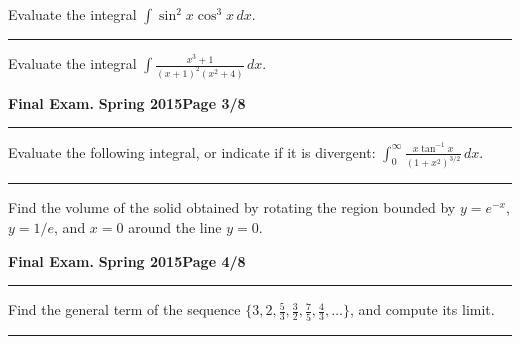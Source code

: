 \documentclass[12pt]{article}
\theoremstyle{definition}
\begin{document}
{\problem[5 pts] Evaluate the integral $\displaystyle{\int
    \sin^2 x \cos^3 x\, dx}$.
\vspace{3.5cm}
\begin{flushright}
\end{flushright}
\hrule

{\problem[5 pts] Evaluate the integral $\displaystyle{\int \frac{x^3+1}{(x+1)^2(x^2+4)}\, dx}$.}
\vspace{4.4cm}
\begin{flushright}
\end{flushright}
\newpage


\hfill{\large\bf Final Exam.}\hfill{\large\bf
  Spring 2015}\hfill{\large\bf Page 3/8}\hrule

\bigskip
{\problem[10 pts] Evaluate the following integral, or indicate if it is
divergent: $\displaystyle{\int_0^\infty \frac{x \tan^{-1}x}{(1+x^2)^{3/2}}\,
dx}$.}
\vspace{8cm}
\begin{flushright}
\end{flushright}
\hrule

{\problem [10 pts] Find the volume of the solid obtained by rotating the region bounded by $y=e^{-x}$, $y=1/e$, and $x=0$ around the line $y=0$.}
\vspace{8cm}
\begin{flushright}
\end{flushright}

\newpage

\hfill{\large\bf Final Exam.}\hfill{\large\bf
  Spring 2015}\hfill{\large\bf Page 4/8}\hrule

\bigskip
{\problem[10 pts] Find the general term of the sequence $\big\{
  3,2,\frac{5}{3}, \frac{3}{2}, \frac{7}{5}, \frac{4}{3}, \dotsc
  \big\}$, and compute its limit.}
\vspace{3cm}
\begin{flushright}
\end{flushright}
\hrule

}
\end{document}
